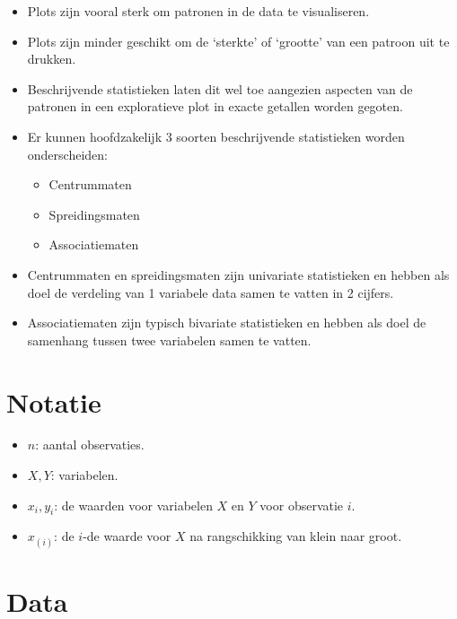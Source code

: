 \documentclass[]{memoir}
\providecommand{\tightlist}{%
  \setlength{\itemsep}{0pt}\setlength{\parskip}{0pt}}
\begin{document}
\begin{itemize}
\tightlist
\item
  Plots zijn vooral sterk om patronen in de data te visualiseren.
\item
  Plots zijn minder geschikt om de `sterkte' of `grootte' van een patroon uit te drukken.
\item
  Beschrijvende statistieken laten dit wel toe aangezien aspecten van de patronen in een exploratieve plot in exacte getallen worden gegoten.
\item
  Er kunnen hoofdzakelijk 3 soorten beschrijvende statistieken worden onderscheiden:

  \begin{itemize}
  \tightlist
  \item
    Centrummaten
  \item
    Spreidingsmaten
  \item
    Associatiematen
  \end{itemize}
\item
  Centrummaten en spreidingsmaten zijn univariate statistieken en hebben als doel de verdeling van 1 variabele data samen te vatten in 2 cijfers.
\item
  Associatiematen zijn typisch bivariate statistieken en hebben als doel de samenhang tussen twee variabelen samen te vatten.
\end{itemize}

\hypertarget{notatie}{%
\section{Notatie}\label{notatie}}

\begin{itemize}
\tightlist
\item
  \(n\): aantal observaties.
\item
  \(X, Y\): variabelen.
\item
  \(x_i, y_i\): de waarden voor variabelen \(X\) en \(Y\) voor observatie \(i\).
\item
  \(x_{(i)}\): de \(i\)-de waarde voor \(X\) na rangschikking van klein naar groot.
\end{itemize}

\hypertarget{data-1}{%
\section{Data}\label{data-1}}
\end{document}
